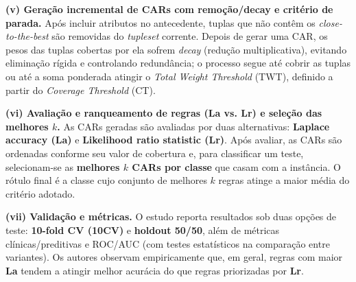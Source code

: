 \textbf{(v) Geração incremental de CARs com remoção/decay e critério de parada.}
Após incluir atributos no antecedente, tuplas que não contêm os \textit{close-to-the-best} são removidas do \textit{tupleset} corrente. 
Depois de gerar uma CAR, os pesos das tuplas cobertas por ela sofrem \textit{decay} (redução multiplicativa), evitando eliminação rígida e controlando redundância; o processo segue até cobrir as tuplas ou até a soma ponderada atingir o \textit{Total Weight Threshold} (TWT), definido a partir do \textit{Coverage Threshold} (CT). 

\textbf{(vi) Avaliação e ranqueamento de regras (La vs. Lr) e seleção das melhores $k$.}
As CARs geradas são avaliadas por duas alternativas: \textbf{Laplace accuracy (La)} e \textbf{Likelihood ratio statistic (Lr)}.
Após avaliar, as CARs são ordenadas conforme seu valor de cobertura e, para classificar um teste, selecionam-se as \textbf{melhores $k$ CARs por classe} que casam com a instância. 
O rótulo final é a classe cujo conjunto de melhores $k$ regras atinge a maior média do critério adotado. 

\textbf{(vii) Validação e métricas.}
O estudo reporta resultados sob duas opções de teste: \textbf{10-fold CV (10CV)} e \textbf{holdout 50/50}, além de métricas clínicas/preditivas e ROC/AUC (com testes estatísticos na comparação entre variantes).
Os autores observam empiricamente que, em geral, regras com maior \textbf{La} tendem a atingir melhor acurácia do que regras priorizadas por \textbf{Lr}. 

